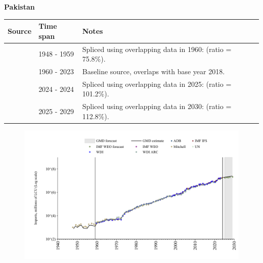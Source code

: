 \documentclass[12pt,a4paper,landscape]{article}
\begin{document}
\begin{adjustbox}{max totalsize={\paperwidth}{\paperheight},center}
\begin{minipage}[t][\textheight][t]{\textwidth}
\vspace*{0.5cm}
{}
\begin{center}
{\Large\bfseries Pakistan}
\end{center}
\vspace{0.5cm}
\begin{table}[H]
\centering
\small
\begin{tabular}{|l|l|l|}
\hline
\textbf{Source} & \textbf{Time span} & \textbf{Notes} \\
\hline
\rowcolor{white}\cite{Mitchell}& 1948 - 1959 &Spliced using overlapping data in 1960: (ratio = 75.8\%).\\
\rowcolor{lightgray}\cite{WDI}& 1960 - 2023 &Baseline source, overlaps with base year 2018.\\
\rowcolor{white}\cite{IMF_IFS}& 2024 - 2024 &Spliced using overlapping data in 2025: (ratio = 101.2\%).\\
\rowcolor{lightgray}\cite{IMF_WEO_forecast}& 2025 - 2029 &Spliced using overlapping data in 2030: (ratio = 112.8\%).\\
\hline
\end{tabular}
\end{table}
\begin{figure}[H]
\centering
\includegraphics[width=\textwidth,height=0.6\textheight,keepaspectratio]{graphs/PAK_imports.pdf}
\end{figure}
\end{minipage}
\end{adjustbox}
\end{document}
